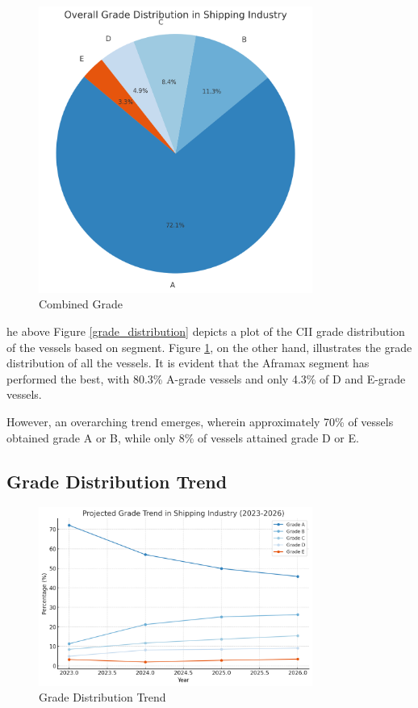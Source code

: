 \begin{figure}[h]
    \centering
    \includegraphics[width=0.8\textwidth]{images/combined_grade.png}
    \caption{Combined Grade}
    \label{combined_grade}
\end{figure}

he above Figure \ref{grade_distribution} depicts a plot of the CII grade distribution of the vessels based on segment. 
Figure \ref{combined_grade}, on the other hand, illustrates the grade distribution of all the vessels. 
It is evident that the Aframax segment has performed the best, with 80.3\% A-grade vessels and only 4.3\% of D and E-grade vessels.

However, an overarching trend emerges, wherein approximately 70\% of vessels obtained grade A or B, while only 8\% of vessels attained grade D or E.

\subsection{Grade Distribution Trend}

\begin{figure}[h]
    \centering
    \includegraphics[width=0.8\textwidth]{images/grade_trend.png}
    \caption{Grade Distribution Trend}
    \label{grade_trend}
\end{figure}

